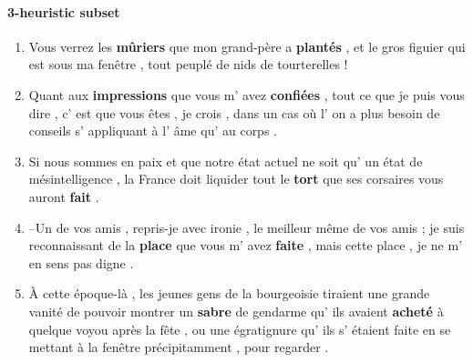 \paragraph{3-heuristic subset}
\begin{enumerate}[itemsep=0pt,label=\arabic*).]
    \item Vous verrez les \textbf{mûriers} que mon grand-père a \textbf{plantés} , et le gros figuier qui est sous ma fenêtre , tout peuplé de nids de tourterelles !
    \item Quant aux \textbf{impressions} que vous m' avez \textbf{confiées} , tout ce que je puis vous dire , c' est que vous êtes , je crois , dans un cas où l' on a plus besoin de conseils s' appliquant à l' âme qu' au corps .
    \item Si nous sommes en paix et que notre état actuel ne soit qu' un état de mésintelligence , la France doit liquider tout le \textbf{tort} que ses corsaires vous auront \textbf{fait} .
    \item --Un de vos amis , repris-je avec ironie , le meilleur même de vos amis ; je suis reconnaissant de la \textbf{place} que vous m' avez \textbf{faite} , mais cette place , je ne m' en sens pas digne .
    \item À cette époque-là , les jeunes gens de la bourgeoisie tiraient une grande vanité de pouvoir montrer un \textbf{sabre} de gendarme qu' ils avaient \textbf{acheté} à quelque voyou après la fête , ou une égratignure qu' ils s' étaient faite en se mettant à la fenêtre précipitamment , pour regarder . 
\end{enumerate}

